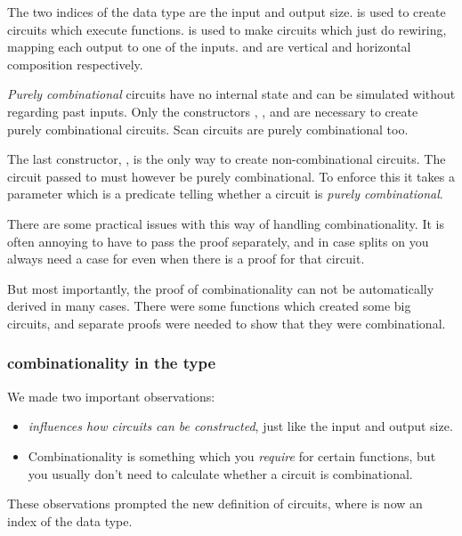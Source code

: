 The two indices of the data type are the input and output
size.
 is used to create circuits which execute functions.
 is used to make circuits which just do rewiring, mapping
each output to one of the inputs.
 and  are vertical and horizontal composition respectively.

\emph{Purely combinational} circuits have no internal state and can be
simulated without regarding past inputs.
Only the constructors , ,  and  are
necessary to create purely combinational circuits.
Scan circuits are purely combinational too.

The last constructor, , is the only way to create
non-combinational circuits.
The circuit passed to  must however be purely
combinational.
To enforce this it takes a parameter  \AY{:}  
which is a predicate telling whether a circuit is \emph{purely
  combinational}.

There are some practical issues with this way of handling
combinationality.
It is often annoying to have to pass the  proof separately,
and in case splits on  you always need a case for 
even when there is a  proof for that circuit.

But most importantly, the proof of combinationality can not be
automatically derived in many cases.
There were some functions which created some big circuits, and
separate proofs were needed to show that they were combinational.

\subsubsection{combinationality in the
  type}\label{combinationality-in-the-type}

We made two important observations:

\begin{itemize}
\item {} \emph{influences how circuits can be constructed},
  just like the input and output size.
\item Combinationality is something which you \emph{require} for
  certain functions, but you usually don't need to calculate whether a
  circuit is combinational.
\end{itemize}

These observations prompted the new definition of circuits, where
 \AY{:}  is now an index of the data type.

